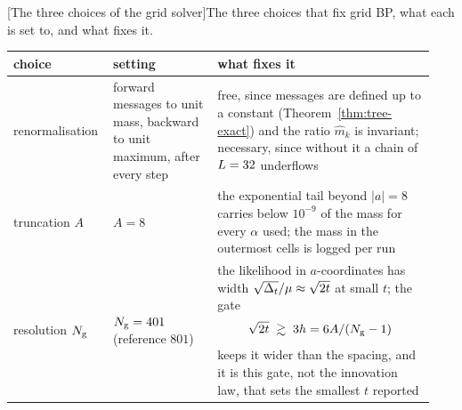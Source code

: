 \begin{center}
\begin{minipage}{\linewidth}\small\centering
{}[The three choices of the grid solver]{The three choices
that fix grid BP, what each is set to, and what fixes it.}
\label{tab:l-grid-choices}
\begin{tabular}{@{}p{0.2\linewidth}p{0.24\linewidth}p{0.5\linewidth}@{}}
\toprule
choice & setting & what fixes it \\
\midrule
renormalisation & forward messages to unit mass, backward to unit maximum, after every step
  & free, since messages are defined up to a constant (Theorem~\ref{thm:tree-exact}) and the ratio $\widehat m_k$ is invariant; necessary, since without it a chain of $L = 32$ underflows \\
truncation $A$ & $A = 8$
  & the exponential tail beyond $|a| = 8$ carries below $10^{-9}$ of the mass for every $\alpha$ used; the mass in the outermost cells is logged per run \\
resolution $N_{\mathrm{g}}$ & $N_{\mathrm{g}} = 401$ (reference $801$)
  & the likelihood in $a$-coordinates has width $\sqrt{\Delta_t}/\mu \approx \sqrt{2t}$ at small $t$; the gate
  \begin{equation}
    \sqrt{2t} \;\gtrsim\; 3h = 6A/(N_{\mathrm{g}} - 1)
    \label{eq:l-resolution}
  \end{equation}
  keeps it wider than the spacing, and it is this gate, not the innovation law, that sets the smallest $t$ reported \\
\bottomrule
\end{tabular}
\end{minipage}
\end{center}

